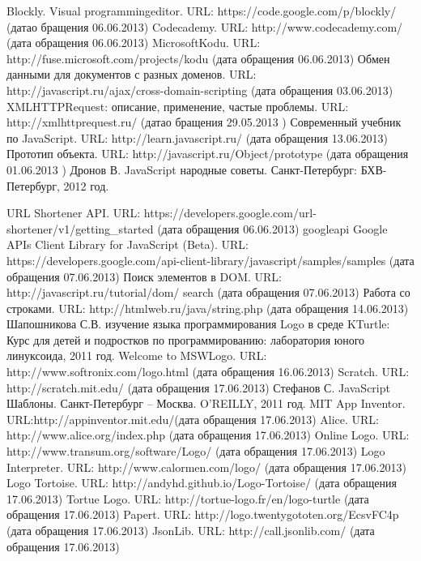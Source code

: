 
\begin{thebibliography}{99}
	Blockly. Visual programmingeditor. URL: https://code.google.com/p/blockly/ (датао бращения 06.06.2013)
	Codecademy. URL: http://www.codecademy.com/ (дата обращения 06.06.2013)
	MicrosoftKodu. URL: http://fuse.microsoft.com/projects/kodu (дата обращения 06.06.2013)
	Обмен данными для документов с разных доменов. URL: http://javascript.ru/ajax/cross-domain-scripting  (дата обращения 03.06.2013)
	XMLHTTPRequest: описание, применение, частые проблемы. URL: http://xmlhttprequest.ru/ (датао бращения 29.05.2013 )
	Современный учебник по JavaScript. URL: http://learn.javascript.ru/ (дата обращения  13.06.2013)
	Прототип объекта. URL: http://javascript.ru/Object/prototype (дата обращения 01.06.2013 )
	Дронов В. JavaScript народные советы. Санкт-Петербург: БХВ-Петербург, 2012 год.

	URL Shortener API. URL: https://developers.google.com/url-shortener/v1/getting\_started (дата обращения 06.06.2013)
\bibitem{}googleapi	Google APIs Client Library for JavaScript (Beta). URL: https://developers.google.com/api-client-library/javascript/samples/samples (дата обращения 07.06.2013)
	Поиск элементов в DOM. URL: http://javascript.ru/tutorial/dom/ search (дата обращения 07.06.2013)
	Работа со строками. URL: http://htmlweb.ru/java/string.php (дата обращения 14.06.2013)
	Шапошникова С.В. изучение языка программирования Logo в среде KTurtle: Курс для детей и подростков по программированию: лаборатория юного линуксоида, 2011 год.
	Welcome to MSWLogo. URL: http://www.softronix.com/logo.html (дата обращения 16.06.2013)
	Scratch. URL: http://scratch.mit.edu/ (дата обращения 17.06.2013)
	Стефанов С. JavaScript Шаблоны. Санкт-Петербург  –  Москва. O'REILLY, 2011 год.
	MIT App Inventor. URL:http://appinventor.mit.edu/(дата обращения 17.06.2013)
	Alice. URL: http://www.alice.org/index.php (дата обращения 17.06.2013)
	Online Logo. URL: http://www.transum.org/software/Logo/ (дата обращения 17.06.2013)
	Logo Interpreter. URL: http://www.calormen.com/logo/ (дата обращения 17.06.2013)
	Logo Tortoise. URL: http://andyhd.github.io/Logo-Tortoise/ (дата обращения 17.06.2013)
	Tortue Logo. URL: http://tortue-logo.fr/en/logo-turtle (дата обращения 17.06.2013)
	Papert. URL: http://logo.twentygototen.org/EcsvFC4p (дата обращения 17.06.2013)
	JsonLib. URL: http://call.jsonlib.com/ (дата обращения 17.06.2013)
\end{thebibliography}
